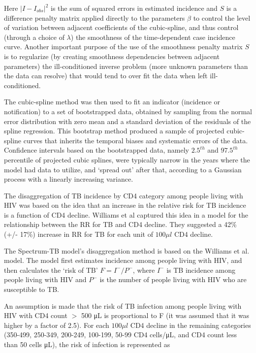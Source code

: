 Here $|I - I_{obs}|^2$  is the sum of squared errors in estimated incidence and $S$ is a difference penalty matrix applied directly to the parameters $\beta$ to control the level of variation between adjacent coefficients of the cubic-spline, and thus control (through a choice of $\lambda$) the smoothness of the time-dependent case incidence curve. Another important purpose of the use of the smoothness penalty matrix $S$ is to regularize (by creating smoothness dependencies between adjacent parameters) the ill-conditioned inverse problem (more unknown parameters than the data can resolve) that would tend to over fit the data when left ill-conditioned.

The cubic-spline method was then used to fit an indicator (incidence or notification) to a set of bootstrapped data, obtained by sampling from the normal error distribution with zero mean and a standard deviation of the residuals of the spline regression. This bootstrap method produced a sample of projected cubic-spline curves that inherits the temporal biases and systematic errors of the data. Confidence intervals based on the bootstrapped data, namely $2.5^{th}$ and $97.5^{th}$ percentile of projected cubic splines, were typically narrow in the years where the model had data to utilize, and ‘spread out’ after that, according to a Gaussian process with a linearly increasing variance.

The disaggregation of TB incidence by CD4 category among people living with HIV was based on the idea that an increase in the relative risk for TB incidence is a function of CD4 decline. Williams et al captured this idea in a model for the relationship between the RR for TB and CD4 decline.\cite{20974976} They suggested a 42\% (+/- 17\%) increase in RR for TB for each unit of $100\mu l$ CD4 decline.

The Spectrum-TB model’s disaggregation method is based on the Williams et al. model. The model first estimates incidence among people living with HIV, and then calculates the ‘risk of TB’ $F=I^- / P^-$, where $I^-$ is TB incidence among people living with HIV and $P^-$ is the number of people living with HIV who are susceptible to TB.

An assumption is made that the risk of TB infection among people living with HIV with CD4 count $>$ 500 μL is proportional to F (it was assumed that it was higher by a factor of 2.5).\cite{15609223} For each $100\mu l$ CD4 decline in the remaining categories (350-499, 250-349, 200-249, 100-199, 50-99 CD4 cells/μL, and CD4 count less than 50 cells μL), the risk of infection is represented as

